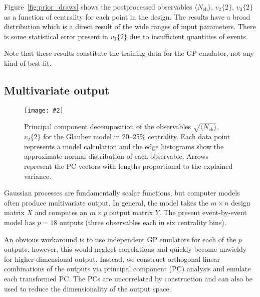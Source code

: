 \documentclass[aps,prc,reprint,amsmath]{revtex4-1}
\newcommand{\colfig}[3][t]{
  \begin{figure}[#1]
    \texttt{[image: \#2]}
    \caption{\label{fig:#2}#3}
  \end{figure}
}
\newcommand{\avg}[1]{\langle #1 \rangle}
\newcommand{\nch}{N_\text{ch}}
\newcommand{\vnk}[2]{v_#1\{#2\}}
\begin{document}
Figure~\ref{fig:prior_draws} shows the postprocessed observables $\avg\nch$, $\vnk 2 2$, $\vnk 3 2$ as a function of centrality for each point in the design.
The results have a broad distribution which is a direct result of the wide ranges of input parameters.
There is some statistical error present in $\vnk 3 2$ due to insufficient quantities of events.

Note that these results constitute the training data for the GP emulator, not any kind of best-fit.

\subsection{Multivariate output}

\colfig[b]{pc_scatter}{
  Principal component decomposition of the observables $\sqrt{\avg\nch}$, $\vnk 2 2$ for the Glauber model in 20--25\% centrality.
  Each data point represents a model calculation and the edge histograms show the approximate normal distribution of each observable.
  Arrows represent the PC vectors with lengths proportional to the explained variance.
}

Gaussian processes are fundamentally scalar functions, but computer models often produce multivariate output.
In general, the model takes the $m \times n$ design matrix $X$ and computes an $m \times p$ output matrix $Y$.
The present event-by-event model has $p = 18$ outputs (three observables each in six centrality bins).

An obvious workaround is to use independent GP emulators for each of the $p$ outputs, however, this would neglect correlations and quickly become unwieldy for higher-dimensional output.
Instead, we construct orthogonal linear combinations of the outputs via principal component (PC) analysis and emulate each transformed PC.
The PCs are uncorrelated by construction and can also be used to reduce the dimensionality of the output space.
\end{document}

